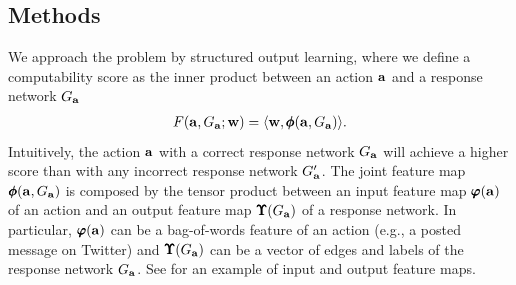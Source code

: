 {%
\subsection{Methods}
We approach the problem by structured output learning, where we define a computability score as the inner product between an action $\mathbf {a}$ and a response network $G_{\mathbf {a}}$
\begin{align*}
	F(\mathbf {a},G_{\mathbf {a}};\mathbf {w}) = \langle \mathbf {w}, \pmb \phi(\mathbf {a},G_{\mathbf {a}}) \rangle.
\end{align*}
Intuitively, the action $\mathbf {a}$ with a correct response network $G_{\mathbf {a}}$ will achieve a higher score than with any incorrect response network $G_{\mathbf {a}}'$.
The joint feature map $\pmb \phi(\mathbf {a},G_{\mathbf {a}})$ is composed by the tensor product between an input feature map $\pmb \varphi(\mathbf {a})$ of an action and an output feature map $\pmb \Upsilon(G_{\mathbf {a}})$ of a response network.
In particular, $\pmb \varphi(\mathbf {a})$ can be a bag-of-words feature of an action (e.g., a posted message on Twitter) and $\pmb \Upsilon(G_{\mathbf {a}})$ can be a vector of edges and labels of the response network $G_{\mathbf {a}}$.
See  for an example of input and output feature maps.

}
